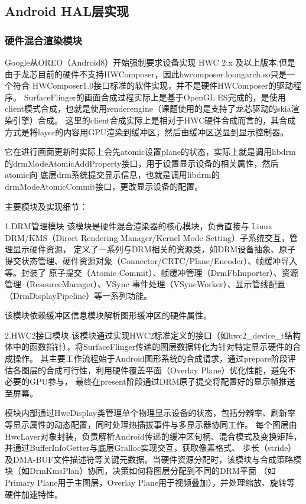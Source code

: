 \subsection{Android HAL层实现}

\subsubsection{硬件混合渲染模块}
Google从OREO（Android8）开始强制要求设备实现 HWC 2.x 及以上版本,但是由于龙芯目前的硬件不支持HWComposer，因此hwcomposer.loongarch.so只是一个符合
HWComposer1.0接口标准的软件实现，并不是硬件HWComposer的驱动程序。
SurfaceFlinger的画面合成过程实际上是基于OpenGL ES完成的，是使用client模式合成，也就是使用renderengine（课题使用的是支持了龙芯驱动的skia渲染引擎）合成。
这里的client合成实际上是相对于HWC硬件合成而言的，其合成方式是将layer的内容用GPU渲染到缓冲区，然后由缓冲区送显到显示控制器。

它在进行画面更新时实际上会先atomic设置plane的状态，实际上就是调用libdrm的drmModeAtomicAddProperty接口，用于设置显示设备的相关属性，然后atomic向
底层drm系统提交显示信息，也就是调用libdrm的drmModeAtomicCommit接口，更改显示设备的配置。

主要模块及实现细节：

1.DRM管理模块
该模块是硬件混合渲染器的核心模块，负责直接与 Linux DRM/KMS（Direct Rendering Manager/Kernel Mode Setting）子系统交互，管理显示硬件资源，
定义了一系列与DRM相关的资源类，如DRM设备抽象、原子提交状态管理、硬件资源对象（Connector/CRTC/Plane/Encoder）、帧缓冲导入等。封装了
原子提交（Atomic Commit）、帧缓冲管理（DrmFbImporter）、资源管理（ResourceManager）、VSync 事件处理（VSyncWorker）、显示管线配置（DrmDisplayPipeline）等一系列功能。

该模块依赖缓冲区信息模块解析图形缓冲区的硬件属性。

2.HWC2接口模块
该模块通过实现HWC2标准定义的接口（如hwc2\_device\_t结构体中的函数指针），将SurfaceFlinger传递的图层数据转化为针对特定显示硬件的合成操作。
其主要工作流程始于Android图形系统的合成请求，通过prepare阶段评估各图层的合成可行性，利用硬件覆盖平面（Overlay Plane）优化性能，避免不必要的GPU参与，
最终在present阶段通过DRM原子提交将配置好的显示帧推送至屏幕。

模块内部通过HwcDisplay类管理单个物理显示设备的状态，包括分辨率、刷新率等显示属性的动态配置，同时处理热插拔事件与多显示器协同工作。
每个图层由HwcLayer对象封装，负责解析Android传递的缓冲区句柄、混合模式及变换矩阵，并通过BufferInfoGetter与底层Gralloc实现交互，获取像素格式、
步长（stride）及DMA-BUF文件描述符等关键元数据。当硬件资源分配时，该模块与合成策略模块（如DrmKmsPlan）协同，决策如何将图层分配到不同的DRM平面
（如Primary Plane用于主图层，Overlay Plane用于视频叠加），并处理缩放、旋转等硬件加速特性。

